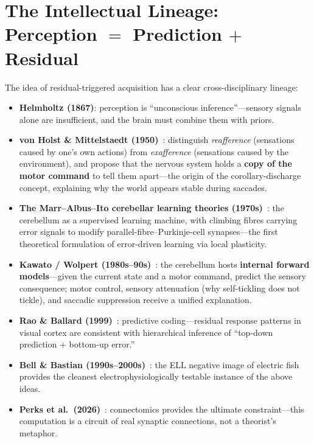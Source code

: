 \documentclass[12pt,a4paper]{article}
\begin{document}
\section{The Intellectual Lineage: Perception $=$ Prediction $+$ Residual}
\label{sec:lineage}

The idea of residual-triggered acquisition has a clear cross-disciplinary lineage:

\begin{itemize}
  \item \textbf{Helmholtz (1867)}: perception is ``unconscious inference''---sensory signals alone are insufficient, and the brain must combine them with priors.
  \item \textbf{von Holst \& Mittelstaedt (1950)}~\cite{vonholst1950}: distinguish \emph{reafference} (sensations caused by one's own actions) from \emph{exafference} (sensations caused by the environment), and propose that the nervous system holds a \textbf{copy of the motor command} to tell them apart---the origin of the corollary-discharge concept, explaining why the world appears stable during saccades.
  \item \textbf{The Marr--Albus--Ito cerebellar learning theories (1970s)}~\cite{marr1969,albus1971,ito1982}: the cerebellum as a supervised learning machine, with climbing fibres carrying error signals to modify parallel-fibre--Purkinje-cell synapses---the first theoretical formulation of error-driven learning via local plasticity.
  \item \textbf{Kawato / Wolpert (1980s--90s)}~\cite{kawato1992,wolpert2000}: the cerebellum hosts \textbf{internal forward models}---given the current state and a motor command, predict the sensory consequence; motor control, sensory attenuation (why self-tickling does not tickle), and saccadic suppression receive a unified explanation.
  \item \textbf{Rao \& Ballard (1999)}~\cite{raoballard1999}: predictive coding---residual response patterns in visual cortex are consistent with hierarchical inference of ``top-down prediction + bottom-up error.''
  \item \textbf{Bell \& Bastian (1990s--2000s)}~\cite{bell1981,bastian1986}: the ELL negative image of electric fish provides the cleanest electrophysiologically testable instance of the above ideas.
  \item \textbf{Perks et al.\ (2026)}~\cite{perks2026}: connectomics provides the ultimate constraint---this computation is a circuit of real synaptic connections, not a theorist's metaphor.
\end{itemize}
\end{document}
